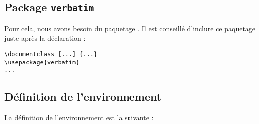 \subsection{Package \texttt{verbatim}}
Pour cela, nous avons besoin du paquetage . Il est conseillé d'inclure ce paquetage juste après la déclaration  :

{\singlespacing
\begin{verbatim}
\documentclass [...] {...}
\usepackage{verbatim}
...
\end{verbatim}
}

\subsection{Définition de l'environnement}
La définition de l'environnement  est la suivante :




